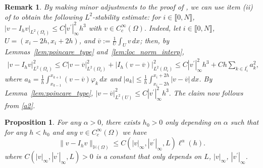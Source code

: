 \documentclass[11 pt]{article}
\newcommand\inter[1]{\llbracket #1\rrbracket}
\newtheorem{remark}[theorem]{Remark}
\newtheorem{proposition}[theorem]{Proposition}
\numberwithin{equation}{section}
\begin{document}
\begin{remark}\label{rem:l2_stability}
By making minor adjustments to the proof of  , we can use item (ii) of  to obtain the following $L^2$-stability estimate: for $i\in\inter{0,N}$, $|v-I_hv|_{L^2(\Omega_i)} \leq C{|v^\prime|^2_{\infty}} h^3$ with $v\in C_c^\infty(\Omega).$ Indeed, let $i\in\inter{0,N}$, $U=({x_i-2h},{x_{i}+2h})$, and $\overline{v}:=\frac{1}{U}\int_U v\, dx$; then, by Lemmas~\ref{lem:poincare_type} and~\ref{lem:loc_norm_interp},
\begin{align}
|v-I_hv|^2_{L^2(\Omega_i)}
\leq C|v-\overline{v}|_{L^2(\Omega_i)}^2 +|I_h(v-\overline{v})|^2_{L^2(\Omega_i)}
\leq C{|v^\prime|^2_{\infty}}h^3+Ch\sum_{k\in I_i^\prime}a_k^2,\label{a2}
\end{align}
where $a_k=\frac{1}{h}\int_{x_{k-1}}^{x_{k+1}} (v-\overline{v})\varphi_k\, dx$ and $|a_k|\leq \frac{1}{h}\int_{x_i-2h}^{x_{i}+2h}|v-\overline{v}|\, dx$. By Lemma~\ref{lem:poincare_type}, $
    |v-\overline{v}|_{L^2(U)}^2\leq C{|v^\prime|^2_{\infty}}h^3.$ The claim now follows from \eqref{a2}.
\end{remark}

\begin{proposition}\label{eq:estab_H_c_infty}
For any $\alpha>0$, there exists $h_0>0$ only depending on $\alpha$ such that for any $h<h_0$ and any $v\in C_c^\infty(\Omega)$ we have
%
\begin{equation}\label{eq:rate_H_c_infty}
    \|v-I_h v\|_{\mathbb H(\Omega)}\leq C(|v|_{\infty},|v^\prime|_{\infty},L)\ell^\alpha(h).
\end{equation}
%
where $C(|v|_{\infty},|v^\prime|_{\infty},L)>0$ is a constant that only depends on $L$, $|v|_{\infty}$, $|v^\prime|_{\infty}$.
\end{proposition}
\end{document}
